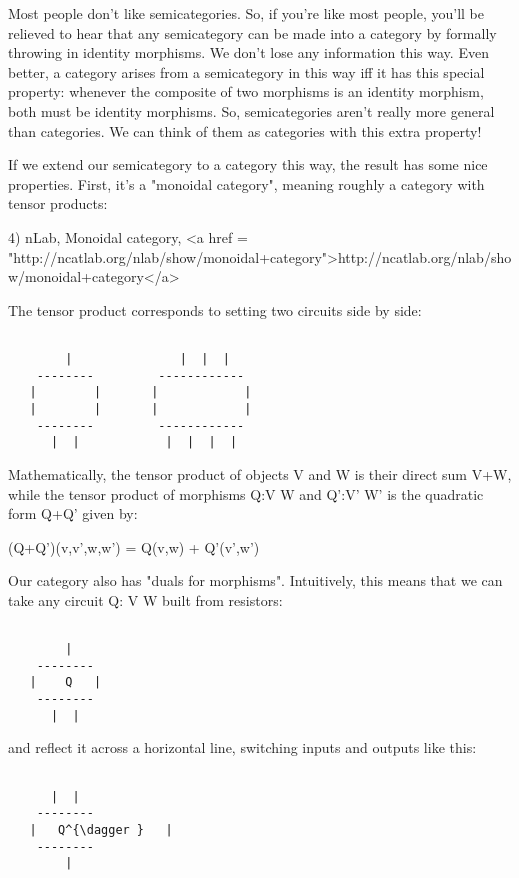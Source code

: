 Most people don't like semicategories.  So, if you're like most
people, you'll be relieved to hear that any semicategory can be made
into a category by formally throwing in identity morphisms.  We don't
lose any information this way.  Even better, a category arises from a
semicategory in this way iff it has this special property: whenever the
composite of two morphisms is an identity morphism, both must be
identity morphisms.  So, semicategories aren't really more general
than categories.  We can think of them as categories with this extra
property!

If we extend our semicategory to a category this way, the result has
some nice properties.  First, it's a "monoidal category", meaning 
roughly a category with tensor products:

4) nLab, Monoidal category, <a href = "http://ncatlab.org/nlab/show/monoidal+category">http://ncatlab.org/nlab/show/monoidal+category</a>

The tensor product corresponds to setting two circuits side by side:


\begin{verbatim}

        |               |  |  |
    --------         ------------   
   |        |       |            |
   |        |       |            |
    --------         ------------
      |  |            |  |  |  |
\end{verbatim}
    

Mathematically, the tensor product of objects V and W is their direct
sum V+W, while the tensor product of morphisms Q:V \to  W and Q':V'
\to  W' is the quadratic form Q+Q' given by:

(Q+Q')(v,v',w,w') = Q(v,w) + Q'(v',w')

Our category also has "duals for morphisms".  Intuitively, this means
that we can take any circuit Q: V \to  W built from resistors:


\begin{verbatim}

        |             
    --------        
   |    Q   |       
    --------        
      |  |          
\end{verbatim}
    
and reflect it across a horizontal line, switching inputs and outputs
like this:


\begin{verbatim}

      |  |          
    --------        
   |   Q^{\dagger }   |       
    --------        
        |             
\end{verbatim}
    

